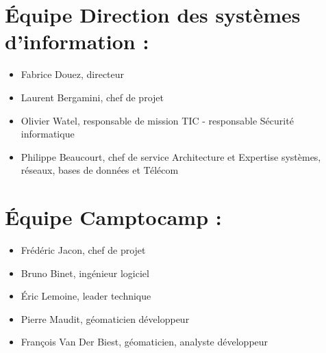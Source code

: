 \documentclass[letterpaper,10pt,french]{sphinxmanual}
\begin{document}
\section{Équipe Direction des systèmes d’information :}
\label{manuel/participants:equipe-direction-des-systemes-dinformation}\begin{itemize}
\item {} 
Fabrice Douez, directeur

\item {} 
Laurent Bergamini, chef de projet

\item {} 
Olivier Watel, responsable de mission TIC - responsable Sécurité informatique

\item {} 
Philippe Beaucourt, chef de service Architecture et Expertise systèmes, réseaux, bases de données et Télécom

\end{itemize}


\section{Équipe Camptocamp :}
\label{manuel/participants:equipe-camptocamp}\begin{itemize}
\item {} 
Frédéric Jacon, chef de projet

\item {} 
Bruno Binet, ingénieur logiciel

\item {} 
Éric Lemoine, leader technique

\item {} 
Pierre Maudit, géomaticien développeur

\item {} 
François Van Der Biest, géomaticien, analyste développeur

\end{itemize}
\end{document}
